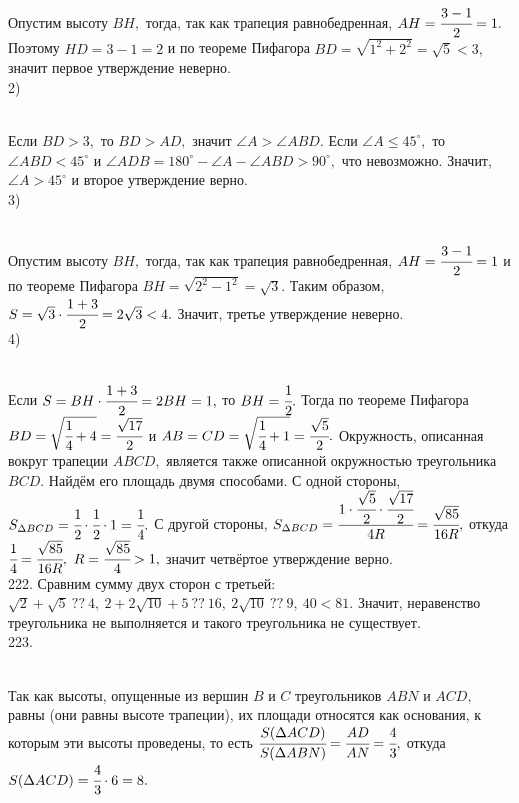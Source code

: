 Опустим высоту $BH,$ тогда, так как трапеция равнобедренная, $AH=\cfrac{3-1}{2}=1.$ Поэтому $HD=3-1=2$ и по теореме Пифагора $BD=\sqrt{1^2+2^2}=\sqrt{5}<3,$ значит первое утверждение неверно.\\
2) \begin{figure}[ht!]
\end{figure}\\
Если $BD>3,$ то $BD>AD,$ значит $\angle A>\angle ABD.$ Если $\angle A\leqslant 45^\circ,$ то $\angle ABD<45^\circ$ и $\angle ADB=180^\circ-\angle A-\angle ABD>90^\circ,$ что невозможно. Значит, $\angle A>45^\circ$ и второе утверждение верно.\\
3) \begin{figure}[ht!]
\end{figure}\\
Опустим высоту $BH,$ тогда, так как трапеция равнобедренная, $AH=\cfrac{3-1}{2}=1$ и по теореме Пифагора $BH=\sqrt{2^2-1^2}=\sqrt{3}.$ Таким образом, $S=\sqrt{3}\cdot\cfrac{1+3}{2}=2\sqrt{3}<4.$ Значит, третье утверждение неверно.\\
4) \begin{figure}[ht!]
\end{figure}\\
Если $S=BH\cdot\cfrac{1+3}{2}=2BH=1,$ то $BH=\cfrac{1}{2}.$ Тогда по теореме Пифагора $BD=\sqrt{\cfrac{1}{4}+4}=\cfrac{\sqrt{17}}{2}$ и $AB=CD=\sqrt{\cfrac{1}{4}+1}=\cfrac{\sqrt{5}}{2}.$ Окружность, описанная вокруг трапеции $ABCD,$ является также описанной окружностью треугольника $BCD.$ Найдём его площадь двумя способами. С одной стороны, $S_{\Delta BCD}=\cfrac{1}{2}\cdot\cfrac{1}{2}\cdot1=\cfrac{1}{4}.$ С другой стороны, $S_{\Delta BCD}=\cfrac{1\cdot\cfrac{\sqrt{5}}{2}\cdot\cfrac{\sqrt{17}}{2}}{4R}=\cfrac{\sqrt{85}}{16R},$ откуда $\cfrac{1}{4}=\cfrac{\sqrt{85}}{16R},\ R=\cfrac{\sqrt{85}}{4}>1,$ значит четвёртое утверждение верно.\\
222. Сравним сумму двух сторон с третьей: $\sqrt{2}+\sqrt{5}\ ??\ 4,\ 2+2\sqrt{10}+5\ ??\ 16,\ 2\sqrt{10}\ ??\ 9,\ 40<81.$ Значит, неравенство треугольника не выполняется и такого треугольника не существует.\\
223. \begin{figure}[ht!]
\end{figure}\\
Так как высоты, опущенные из вершин $B$ и $C$ треугольников $ABN$ и $ACD,$ равны (они равны высоте трапеции), их площади относятся как основания, к которым эти высоты проведены, то есть $\cfrac{S(\Delta ACD)}{S(\Delta ABN)}=\cfrac{AD}{AN}=\cfrac{4}{3},$ откуда $S(\Delta ACD)=\cfrac{4}{3}\cdot6=8.$\\
